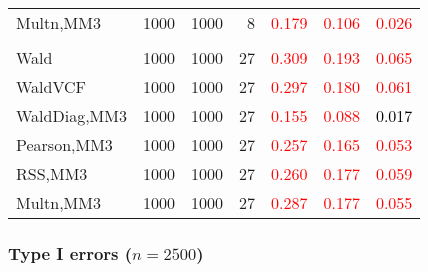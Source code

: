 \documentclass[
]{article}
\begin{document}
\begin{table}[H]
{\begin{tabular}[t]{lrrrrrr}
\hspace{1em}Multn,MM3 & 1000 & 1000 & 8 & \textcolor{red}{0.179} & \textcolor{red}{0.106} & \textcolor{red}{0.026}\\
\addlinespace[0.3em]
\multicolumn{7}{l}{\textbf{3F 15V}}\\
\hspace{1em}Wald & 1000 & 1000 & 27 & \textcolor{red}{0.309} & \textcolor{red}{0.193} & \textcolor{red}{0.065}\\
\hspace{1em}WaldVCF & 1000 & 1000 & 27 & \textcolor{red}{0.297} & \textcolor{red}{0.180} & \textcolor{red}{0.061}\\
\hspace{1em}WaldDiag,MM3 & 1000 & 1000 & 27 & \textcolor{red}{0.155} & \textcolor{red}{0.088} & \textcolor{black}{0.017}\\
\hspace{1em}Pearson,MM3 & 1000 & 1000 & 27 & \textcolor{red}{0.257} & \textcolor{red}{0.165} & \textcolor{red}{0.053}\\
\hspace{1em}RSS,MM3 & 1000 & 1000 & 27 & \textcolor{red}{0.260} & \textcolor{red}{0.177} & \textcolor{red}{0.059}\\
\hspace{1em}Multn,MM3 & 1000 & 1000 & 27 & \textcolor{red}{0.287} & \textcolor{red}{0.177} & \textcolor{red}{0.055}\\
\bottomrule
\end{tabular}}
\endgroup{}
\end{table}

\subsubsection{\texorpdfstring{Type I errors
(\(n=2500\))}{Type I errors (n=2500)}}\label{type-i-errors-n2500-1}
\end{document}
